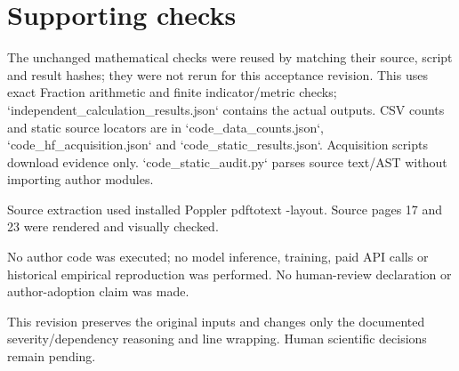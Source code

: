 \documentclass[10pt]{article}
\begin{document}
\section*{Supporting checks}
The unchanged mathematical checks were reused by matching their source, script and result hashes; they were not rerun for this acceptance revision. This uses exact Fraction arithmetic and finite indicator/metric checks; `independent\_calculation\_results.json` contains the actual outputs. CSV counts and static source locators are in `code\_data\_counts.json`, `code\_hf\_acquisition.json` and `code\_static\_results.json`. Acquisition scripts download evidence only. `code\_static\_audit.py` parses source text/AST without importing author modules.\par
Source extraction used installed Poppler pdftotext -layout. Source pages 17 and 23 were rendered and visually checked.\par
No author code was executed; no model inference, training, paid API calls or historical empirical reproduction was performed. No human-review declaration or author-adoption claim was made.\par
This revision preserves the original inputs and changes only the documented severity/dependency reasoning and line wrapping. Human scientific decisions remain pending.\par
\end{document}
